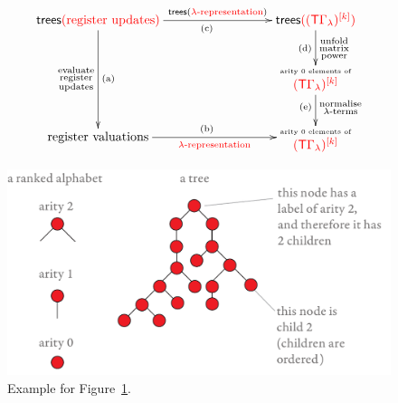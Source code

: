 \begin{figure}[]
    \centering
    \begin{align*}
        \xymatrix@C=3cm{
            \trees \ranked{\text{(register updates)}} 
            \ar[dd]_{\substack{\text{evaluate}\\\text{register}\\\text{updates}}}^{\text{(a)}}
            \ar[r]^-{\trees(\text{\ranked{$\lambda$-representation}})}_{\text{(c)}}
            &
            \trees \ranked{(\mati k{(\tmonad \Gamma_\lambda)})}
            \ar[d]^{\substack{\text{unfold}\\\text{matrix}\\\text{power}}}_{\text{(d)}} \\
            & 
            \txt{{\tiny arity 0 elements of }\\
            $
            \mati k {\ranked{(\tmonad \Gamma_\lambda)}}
            $}
            \ar[d]^{\substack{\text{normalise}\\\text{$\lambda$-terms}}}_{\text{(e)}}\\
             \text{register valuations}
            \ar[r]_-{\ranked{\text{$\lambda$-representation}}}^{\text{(b)}}
            &
            \txt{{\tiny arity 0 elements of }\\
            $
            \mati k {\ranked{(\tmonad \Gamma_\lambda)}}
            $}
        }
    \end{align*} 
    \caption{}
    \label{fig:lambda-representation-diagram}
\end{figure}
\begin{figure}[]   
    \hspace{-0.5cm}
    \includegraphics[page=120,scale=0.34]{pics}
    \caption{Example for Figure~\ref{fig:lambda-representation-diagram}.}
    \label{fig:lambda-representation-proof}
\end{figure}
 
